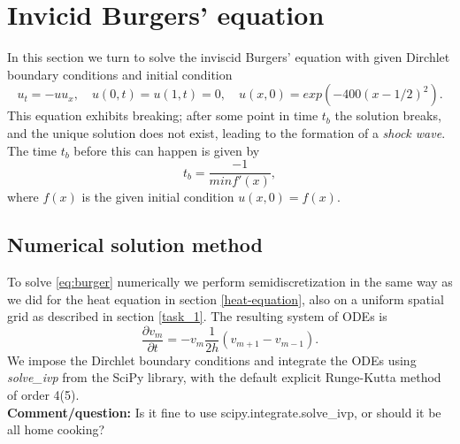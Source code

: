 %
%    

\section{Invicid Burgers' equation}

In this section we turn to solve the inviscid Burgers' equation with given Dirchlet boundary conditions and initial condition
\begin{equation}
    u_t = -uu_x, \quad u(0, t) = u(1, t) = 0, \quad u(x, 0) = exp(-400(x-1/2)^2).
    \label{eq:burger}
\end{equation}
This equation exhibits breaking; 
after some point in time $t_b$ the solution breaks, 
and the unique solution does not exist, 
leading to the formation of a \textit{shock wave}.\cite{burgers} 
The time $t_b$ before this can happen is given by
\begin{equation}
    t_b = \frac{-1}{min f'(x)}, 
    \label{eq:t_break}
\end{equation}
where $f(x)$ is the given initial condition $u(x, 0) = f(x)$.\cite{burgers} 

\subsection*{Numerical solution method}
To solve \eqref{eq:burger} numerically we perform semidiscretization in the same way as we did for the heat equation in section \ref{heat-equation}, 
also on a uniform spatial grid as described in section \ref{task_1}. 
The resulting system of ODEs is
\begin{equation*}
    \frac{\partial v_m}{\partial t} = -v_m \frac{1}{2h} (v_{m+1} - v_{m-1}). 
\end{equation*}
We impose the Dirchlet boundary conditions and integrate the ODEs using \textit{solve\_ivp} from the SciPy library, 
with the default explicit Runge-Kutta method of order 4(5)\cite{solve_ivp}. \\
\textbf{Comment/question:} Is it fine to use scipy.integrate.solve\_ivp, 
or should it be all home cooking? 

